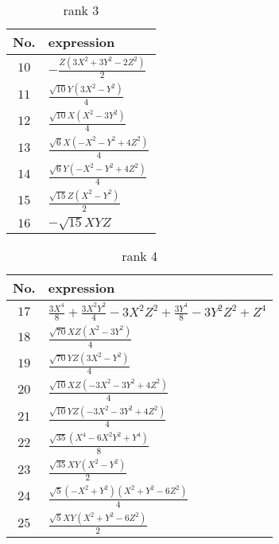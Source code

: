 \documentclass[fleqn,8pt,landscape]{jsarticle}
\begin{document}
\begin{table}[ht!]
\begin{center}
\caption{rank 3}
\renewcommand{\arraystretch}{1.3}
\begin{tabular}{cl} \hline \hline
No. & expression \\ \hline
$ 10 $ & $ - \frac{Z \left(3 X^{2} + 3 Y^{2} - 2 Z^{2}\right)}{2} $ \\
$ 11 $ & $ \frac{\sqrt{10} Y \left(3 X^{2} - Y^{2}\right)}{4} $ \\
$ 12 $ & $ \frac{\sqrt{10} X \left(X^{2} - 3 Y^{2}\right)}{4} $ \\
$ 13 $ & $ \frac{\sqrt{6} X \left(- X^{2} - Y^{2} + 4 Z^{2}\right)}{4} $ \\
$ 14 $ & $ \frac{\sqrt{6} Y \left(- X^{2} - Y^{2} + 4 Z^{2}\right)}{4} $ \\
$ 15 $ & $ \frac{\sqrt{15} Z \left(X^{2} - Y^{2}\right)}{2} $ \\
$ 16 $ & $ - \sqrt{15} X Y Z $ \\
 \hline \hline
\end{tabular}
\end{center}
\end{table}
\begin{table}[ht!]
\begin{center}
\caption{rank 4}
\renewcommand{\arraystretch}{1.3}
\begin{tabular}{cl} \hline \hline
No. & expression \\ \hline
$ 17 $ & $ \frac{3 X^{4}}{8} + \frac{3 X^{2} Y^{2}}{4} - 3 X^{2} Z^{2} + \frac{3 Y^{4}}{8} - 3 Y^{2} Z^{2} + Z^{4} $ \\
$ 18 $ & $ \frac{\sqrt{70} X Z \left(X^{2} - 3 Y^{2}\right)}{4} $ \\
$ 19 $ & $ \frac{\sqrt{70} Y Z \left(3 X^{2} - Y^{2}\right)}{4} $ \\
$ 20 $ & $ \frac{\sqrt{10} X Z \left(- 3 X^{2} - 3 Y^{2} + 4 Z^{2}\right)}{4} $ \\
$ 21 $ & $ \frac{\sqrt{10} Y Z \left(- 3 X^{2} - 3 Y^{2} + 4 Z^{2}\right)}{4} $ \\
$ 22 $ & $ \frac{\sqrt{35} \left(X^{4} - 6 X^{2} Y^{2} + Y^{4}\right)}{8} $ \\
$ 23 $ & $ \frac{\sqrt{35} X Y \left(X^{2} - Y^{2}\right)}{2} $ \\
$ 24 $ & $ \frac{\sqrt{5} \left(- X^{2} + Y^{2}\right) \left(X^{2} + Y^{2} - 6 Z^{2}\right)}{4} $ \\
$ 25 $ & $ \frac{\sqrt{5} X Y \left(X^{2} + Y^{2} - 6 Z^{2}\right)}{2} $ \\
 \hline \hline
\end{tabular}
\end{center}
\end{table}
\end{document}
